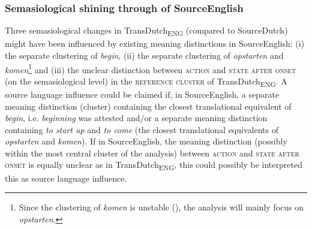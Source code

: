 \subsubsection{Semasiological shining through of SourceEnglish}
\label{sec:4.6.1.1}  
Three semasiological changes in TransDutch\textsubscript{ENG} (compared to SourceDutch) might have been influenced by existing meaning distinctions in SourceEnglish: (i) the separate clustering of \textit{begin}, (ii) the separate clustering of \textit{opstarten} and \textit{komen}\footnote{Since the clustering of \textit{komen} is unstable (), the analysis will mainly focus on \textit{opstarten}.} and (iii) the unclear distinction between \textsc{action} and \textsc{state after onset} (on the semasiological level) in the \textsc{reference cluster} of TransDutch\textsubscript{ENG}. A source language influence could be claimed if, in SourceEnglish, a separate meaning distinction (cluster) containing the closest translational equivalent of \textit{begin}, i.e. \textit{beginning} was attested and\slash or a separate meaning distinction containing \textit{to start up} and \textit{to come} (the closest translational equivalents of \textit{opstarten} and \textit{komen}). If in SourceEnglish, the meaning distinction (possibly within the most central cluster of the analysis) between \textsc{action} and \textsc{state after onset} is equally unclear as in TransDutch\textsubscript{ENG}, this could possibly be interpreted this as source language influence.

